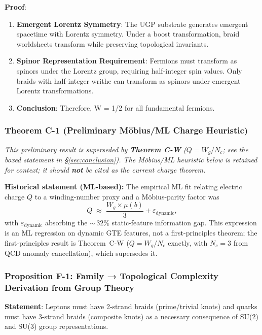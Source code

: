 \documentclass[11pt]{article}
\theoremstyle{remark}
\begin{document}
\textbf{Proof}:
\begin{enumerate}
    \item \textbf{Emergent Lorentz Symmetry}: The UGP substrate generates emergent spacetime with Lorentz symmetry. Under a boost transformation, braid worldsheets transform while preserving topological invariants.
    
    \item \textbf{Spinor Representation Requirement}: Fermions must transform as spinors under the Lorentz group, requiring half-integer spin values. Only braids with half-integer writhe can transform as spinors under emergent Lorentz transformations.
    
    \item \textbf{Conclusion}: Therefore, W = 1/2 for all fundamental fermions.
\end{enumerate}

\subsubsection{Theorem C-1 (Preliminary Möbius/ML Charge Heuristic)}

\textit{This preliminary result is superseded by \textbf{Theorem C-W} ($Q = W_g / N_c$;
see the boxed statement in \S\ref{sec:conclusion}). The Möbius/ML
heuristic below is retained for context; it should
\textbf{not} be cited as the current charge theorem.}

\textbf{Historical statement (ML-based):} The empirical
ML fit relating electric charge $Q$ to a winding-number proxy and a
Möbius-parity factor was
\begin{equation}
Q \;\approx\; \frac{W_g \times \mu(b)}{3} + \varepsilon_{\text{dynamic}},
\end{equation}
with $\varepsilon_{\text{dynamic}}$ absorbing the
${\sim}\,32\%$ static-feature information gap. This expression is an
ML regression on dynamic GTE features, not a first-principles theorem;
the first-principles result is Theorem~C-W ($Q = W_g/N_c$ exactly,
with $N_c = 3$ from QCD anomaly cancellation), which supersedes it.

\subsubsection{Proposition F-1: Family → Topological Complexity Derivation from Group Theory}

\textbf{Statement}: Leptons must have 2-strand braids (prime/trivial knots) and quarks must have 3-strand braids (composite knots) as a necessary consequence of SU(2) and SU(3) group representations.
\end{document}
